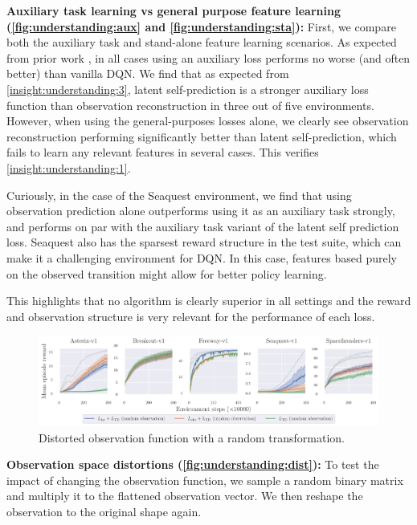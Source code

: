 \textbf{Auxiliary task learning vs general purpose feature learning (\autoref{fig:understanding:aux} and \autoref{fig:understanding:sta}):}
First, we compare both the auxiliary task and stand-alone feature learning scenarios.
As expected from prior work \parencite{jaderberg2016reinforcement,schwarzer2021dataefficient,farebrother2023protovalue}, in all cases using an auxiliary loss performs no worse (and often better) than vanilla DQN.
We find that as expected from \autoref{insight:understanding:3}, latent self-prediction is a stronger auxiliary loss function than observation reconstruction in three out of five environments.
However, when using the general-purposes losses alone, we clearly see observation reconstruction performing significantly better than latent self-prediction, which fails to learn any relevant features in several cases. This verifies \autoref{insight:understanding:1}.


Curiously, in the case of the Seaquest environment, we find that using observation prediction alone outperforms using it as an auxiliary task strongly, and performs on par with the auxiliary task variant of the latent self prediction loss.
Seaquest also has the sparsest reward structure in the test suite, which can make it a challenging environment for DQN. In this case, features based purely on the observed transition might allow for better policy learning.

This highlights that no algorithm is clearly superior in all settings and the reward and observation structure is very relevant for the performance of each loss.


\begin{figure}[t]
    \centering
    \includegraphics[width=\textwidth]{figures/understanding/rlc2024-distorted-fixed_minatar.pdf}
    \caption{Distorted observation function with a random transformation.}
    \label{fig:understanding:dist}
\end{figure}

\textbf{Observation space distortions (\autoref{fig:understanding:dist}):} To test the impact of changing the observation function, we sample a random binary matrix and multiply it to the flattened observation vector. We then reshape the observation to the original shape again.


